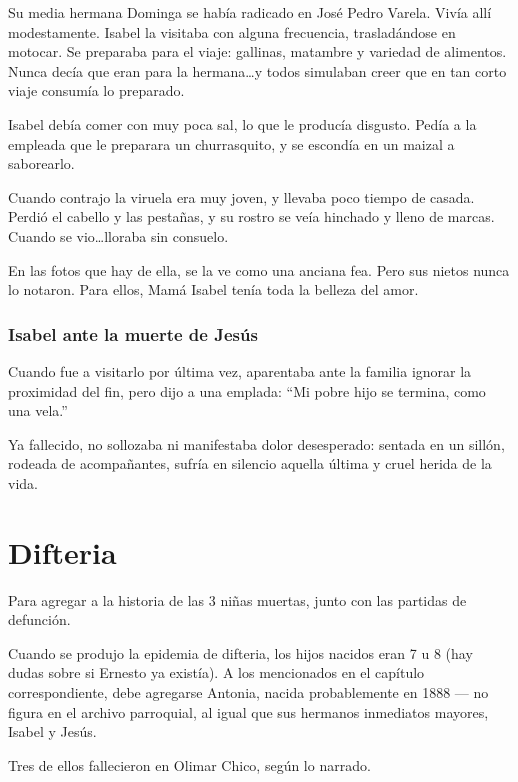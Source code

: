\documentclass[a4paper]{article}
\begin{document}
\bigbreak{}

Su media hermana Dominga se había radicado en José Pedro Varela. Vivía allí modestamente. Isabel la visitaba con alguna frecuencia, trasladándose en motocar. Se preparaba para el viaje: gallinas, matambre y variedad de alimentos. Nunca decía que eran para la hermana\ldots y todos simulaban creer que en tan corto viaje consumía lo preparado.

\bigbreak{}

Isabel debía comer con muy poca sal, lo que le producía disgusto. Pedía a la empleada que le preparara un churrasquito, y se escondía en un maizal a saborearlo.

\bigbreak{}

Cuando contrajo la viruela era muy joven, y llevaba poco tiempo de casada. Perdió el cabello y las pestañas, y su rostro se veía hinchado y lleno de marcas. Cuando se vio\ldots lloraba sin consuelo.

En las fotos que hay de ella, se la ve como una anciana fea. Pero sus nietos nunca lo notaron. Para ellos, Mamá Isabel tenía toda la belleza del amor.

\subsubsection{Isabel ante la muerte de Jesús}

Cuando fue a visitarlo por última vez, aparentaba ante la familia ignorar la proximidad del fin, pero dijo a una emplada: ``Mi pobre hijo se termina, como una vela.''

Ya fallecido, no sollozaba ni manifestaba dolor desesperado: sentada en un sillón, rodeada de acompañantes, sufría en silencio aquella última y cruel herida de la vida.

\section{Difteria}

Para agregar a la historia de las 3 niñas muertas, junto con las partidas de defunción.

Cuando se produjo la epidemia de difteria, los hijos nacidos eran 7 u 8 (hay dudas sobre si Ernesto ya existía). A los mencionados en el capítulo correspondiente, debe agregarse Antonia, nacida probablemente en 1888 --- no figura en el archivo parroquial, al igual que sus hermanos inmediatos mayores, Isabel y Jesús.

Tres de ellos fallecieron en Olimar Chico, según lo narrado.
\end{document}

